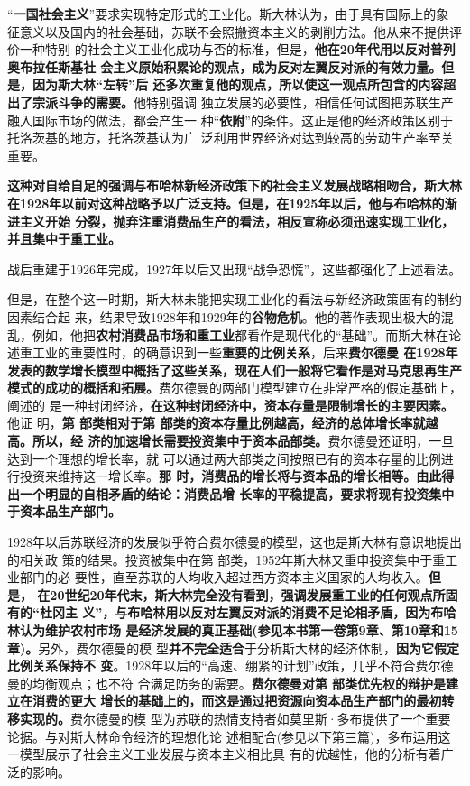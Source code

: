“\textbf{一国社会主义}”要求实现特定形式的工业化。斯大林认为，由于具有国际上的象
征意义以及国内的社会基础，苏联不会照搬资本主义的剥削方法。他从来不提供评价一种特别
的社会主义工业化成功与否的标准，但是，\textbf{他在20年代用以反对普列奥布拉任斯基社
  会主义原始积累论的观点，成为反对左翼反对派的有效力量。但是，因为斯大林“左转”后
  还多次重复他的观点，所以使这一观点所包含的内容超出了宗派斗争的需要。}他特别强调
独立发展的必要性，相信任何试图把苏联生产融入国际市场的做法，都会产生一
种“\textbf{依附}”的条件。这正是他的经济政策区别于托洛茨基的地方，托洛茨基认为广
泛利用世界经济对达到较高的劳动生产率至关重要。

\textbf{这种对自给自足的强调与布哈林新经济政策下的社会主义发展战略相吻合，斯大林
  在1928年以前对这种战略予以广泛支持。但是，在1925年以后，他与布哈林的渐进主义开始
  分裂，抛弃注重消费品生产的看法，相反宣称必须迅速实现工业化，并且集中于重工业。}

战后重建于1926年完成，1927年以后又出现“战争恐慌”，这些都强化了上述看法。

但是，在整个这一时期，斯大林未能把实现工业化的看法与新经济政策固有的制约因素结合起
来，结果导致1928年和1929年的\textbf{谷物危机}。他的著作表现出极大的混
乱，例如，他把\textbf{农村消费品市场和重工业}都看作是现代化的“基础”。而斯大林在论
述重工业的重要性时，的确意识到一些\textbf{重要的比例关系}，后来\textbf{费尔德曼
  在1928年发表的数学增长模型中概括了这些关系，现在人们一般将它看作是对马克思再生产
  模式的成功的概括和拓展。}费尔德曼的两部门模型建立在非常严格的假定基础上，阐述的
是一种封闭经济，\textbf{在这种封闭经济中，资本存量是限制增长的主要因素。}他证
明，\textbf{第 部类相对于第 部类的资本存量比例越高，经济的总体增长率就越高。所以，经
  济的加速增长需要投资集中于资本品部类。}费尔德曼还证明，一旦达到一个理想的增长率，就
可以通过两大部类之间按照已有的资本存量的比例进行投资来维持这一增长率。\textbf{那
  时，消费品的增长将与资本品的增长相等。由此得出一个明显的自相矛盾的结论：消费品增
  长率的平稳提高，要求将现有投资集中于资本品生产部门。}

1928年以后苏联经济的发展似乎符合费尔德曼的模型，这也是斯大林有意识地提出的相关政
策的结果。投资被集中在第 部类，1952年斯大林又重申投资集中于重工业部门的必
要性，直至苏联的人均收入超过西方资本主义国家的人均收入。\textbf{但是，
  在20世纪20年代末，斯大林完全没有看到，强调发展重工业的任何观点所固有的“杜冈主
  义”，与布哈林用以反对左翼反对派的消费不足论相矛盾，因为布哈林认为维护农村市场
  是经济发展的真正基础(参见本书第一卷第9章、第10章和15章)。}另外，费尔德曼的模
型\textbf{并不完全适合}于分析斯大林的经济体制，\textbf{因为它假定比例关系保持不
  变}。1928年以后的“高速、绷紧的计划”政策，几乎不符合费尔德曼的均衡观点；也不符
合满足防务的需要。\textbf{费尔德曼对第 部类优先权的辩护是建立在消费的更大
  增长的基础上的，而这是通过把资源向资本品生产部门的最初转移实现的。}费尔德曼的模
型为苏联的热情支持者如莫里斯·多布提供了一个重要论据。与对斯大林命令经济的理想化论
述相配合(参见以下第三篇)，多布运用这一模型展示了社会主义工业发展与资本主义相比具
有的优越性，他的分析有着广泛的影响。

